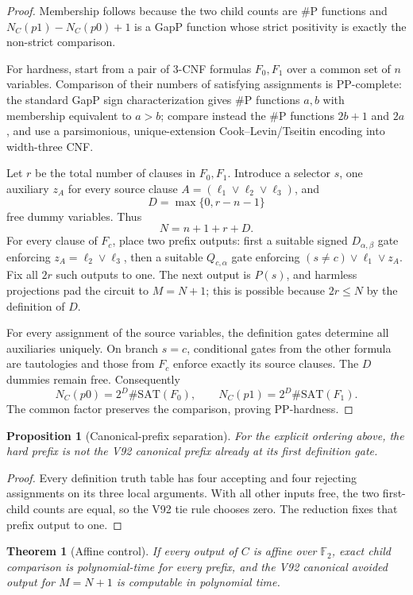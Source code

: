 \documentclass[11pt]{article}
\newtheorem{theorem}{Theorem}
\newtheorem{proposition}{Proposition}
\newcommand{\sat}{\#\mathrm{SAT}}
\begin{document}
\begin{proof}
Membership follows because the two child counts are \#P functions and
$N_C(p1)-N_C(p0)+1$ is a GapP function whose strict positivity is exactly the
non-strict comparison.

For hardness, start from a pair of 3-CNF formulas $F_0,F_1$ over a common set
of $n$ variables.  Comparison of their numbers of satisfying assignments is
PP-complete: the standard GapP sign characterization gives \#P functions
$a,b$ with membership equivalent to $a>b$; compare instead the \#P functions
$2b+1$ and $2a$, and use a parsimonious, unique-extension Cook--Levin/Tseitin
encoding into width-three CNF.

Let $r$ be the total number of clauses in $F_0,F_1$.  Introduce a selector $s$,
one auxiliary $z_A$ for every source clause $A=(\ell_1\lor\ell_2\lor\ell_3)$,
and
\[
 D=\max\{0,r-n-1\}
\]
free dummy variables.  Thus
\[
 N=n+1+r+D.
\]
For every clause of $F_c$, place two prefix outputs: first a suitable signed
$D_{\alpha,\beta}$ gate enforcing
$z_A=\ell_2\lor\ell_3$, then a suitable $Q_{c,\alpha}$ gate enforcing
$(s\ne c)\lor\ell_1\lor z_A$.  Fix all $2r$ such outputs to one.  The next
output is $P(s)$, and harmless projections pad the circuit to $M=N+1$; this is
possible because $2r\le N$ by the definition of $D$.

For every assignment of the source variables, the definition gates determine
all auxiliaries uniquely.  On branch $s=c$, conditional gates from the other
formula are tautologies and those from $F_c$ enforce exactly its source
clauses.  The $D$ dummies remain free.  Consequently
\[
 N_C(p0)=2^D\sat(F_0),\qquad
 N_C(p1)=2^D\sat(F_1).
\]
The common factor preserves the comparison, proving PP-hardness.
\end{proof}

\begin{proposition}[Canonical-prefix separation]
For the explicit ordering above, the hard prefix is not the V92 canonical
prefix already at its first definition gate.
\end{proposition}

\begin{proof}
Every definition truth table has four accepting and four rejecting assignments
on its three local arguments.  With all other inputs free, the two first-child
counts are equal, so the V92 tie rule chooses zero.  The reduction fixes that
prefix output to one.
\end{proof}

\begin{theorem}[Affine control]
If every output of $C$ is affine over $\mathbb F_2$, exact child comparison is
polynomial-time for every prefix, and the V92 canonical avoided output for
$M=N+1$ is computable in polynomial time.
\end{theorem}
\end{document}
